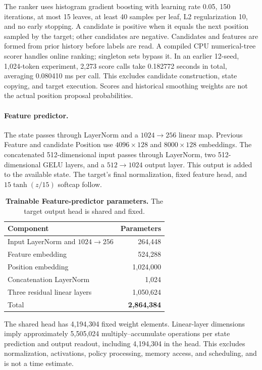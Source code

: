 The ranker uses histogram gradient boosting with learning rate 0.05, 150 iterations, at most 15 leaves, at least 40 samples per leaf, L2 regularization 10, and no early stopping. A candidate is positive when it equals the next position sampled by the target; other candidates are negative. Candidates and features are formed from prior history before labels are read. A compiled CPU numerical-tree scorer handles online ranking; singleton sets bypass it. In an earlier 12-seed, 1,024-token experiment, 2,273 score calls take 0.182772 seconds in total, averaging 0.080410 ms per call. This excludes candidate construction, state copying, and target execution. Scores and historical smoothing weights are not the actual position proposal probabilities.

\paragraph{Feature predictor.}
The state passes through LayerNorm and a $1024\to256$ linear map. Previous Feature and candidate Position use $4096\times128$ and $8000\times128$ embeddings. The concatenated 512-dimensional input passes through LayerNorm, two 512-dimensional GELU layers, and a $512\to1024$ output layer. This output is added to the available state. The target's final normalization, fixed feature head, and $15\tanh(z/15)$ softcap follow.

\begin{table}[t]
\centering\small
\caption{\textbf{Trainable Feature-predictor parameters.} The target output head is shared and fixed.}
\label{tab:parameters}
\begin{tabular}{@{}lr@{}}\toprule
Component & Parameters\\\midrule
Input LayerNorm and $1024\to256$ & 264,448\\
Feature embedding & 524,288\\
Position embedding & 1,024,000\\
Concatenation LayerNorm & 1,024\\
Three residual linear layers & 1,050,624\\\midrule
Total & \textbf{2,864,384}\\\bottomrule
\end{tabular}
\end{table}

The shared head has 4,194,304 fixed weight elements. Linear-layer dimensions imply approximately 5,505,024 multiply--accumulate operations per state prediction and output readout, including 4,194,304 in the head. This excludes normalization, activations, policy processing, memory access, and scheduling, and is not a time estimate.

